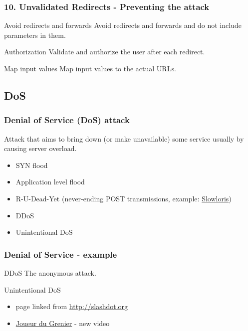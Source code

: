 \begin{frame}
\frametitle{10. Unvalidated Redirects - Preventing the attack}
\begin{block}{Avoid redirects and forwards}
Avoid redirects and forwards and do not include parameters in them.
\end{block}
\begin{block}{Authorization}
Validate and authorize the user after each redirect.
\end{block}
\begin{exampleblock}{Map input values}
Map input values to the actual URLs.
\end{exampleblock}
\end{frame}

\subsection{DoS}

\begin{frame}
\frametitle{Denial of Service (DoS) attack}
Attack that aims to bring down (or make unavailable) some service usually by
causing server overload.
\begin{itemize}
\item SYN flood
\item Application level flood
\item R-U-Dead-Yet
	(never-ending POST transmissions,
	example: \href{http://ha.ckers.org/slowloris/}{Slowloris})
\item DDoS
\item Unintentional DoS
\end{itemize}
\end{frame}

\begin{frame}
\frametitle{Denial of Service - example}
\begin{exampleblock}{DDoS}
The anonymous attack.
\end{exampleblock}
\begin{exampleblock}{Unintentional DoS}
\begin{itemize}
\item page linked from \url{http://slashdot.org}
\item \href{http://www.joueurdugrenier.fr/}{Joueur du Grenier} - new video
\end{itemize}
\end{exampleblock}
\end{frame}

